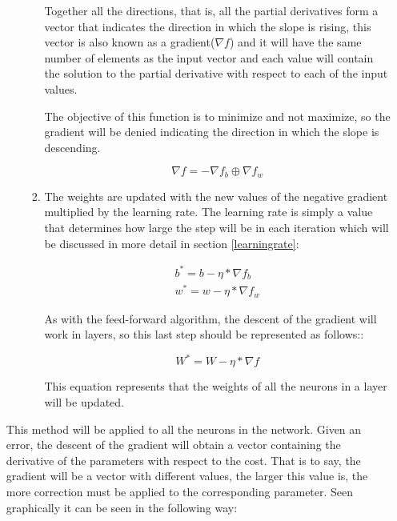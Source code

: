 \begin{itemize}
\begin{enumerate}
\begin{enumerate}
Together all the directions, that is, all the partial derivatives form a vector that indicates the direction in which the slope is rising, this vector is also known as a gradient($\nabla f$) and it will have the same number of elements as the input vector and each value will contain the solution to the partial derivative with respect to each of the input values.
\newline

The objective of this function is to minimize and not maximize, so the gradient will be denied indicating the direction in which the slope is descending.

\begin{equation}
    \nabla f = -\nabla f_b \oplus \nabla f_w
\end{equation}

\item The weights are updated with the new values of the negative gradient multiplied by the learning rate. The learning rate is simply a value that determines how large the step will be in each iteration which will be discussed in more detail in section \ref{learningrate}:

\begin{equation}
    \begin{split}
    b^* = b - \eta * \nabla f_b \\
    w^* = w - \eta * \nabla f_w
    \end{split}
\end{equation}

As with the feed-forward algorithm, the descent of the gradient will work in layers, so this last step should be represented as follows::

\begin{equation}
    W^* = W - \eta * \nabla f
\end{equation}

This equation represents that the weights of all the neurons in a layer will be updated.

\end{enumerate}
\end{enumerate}

This method will be applied to all the neurons in the network. Given an error, the descent of the gradient will obtain a vector containing the derivative of the parameters with respect to the cost. That is to say, the gradient will be a vector with different values, the larger this value is, the more correction must be applied to the corresponding parameter. Seen graphically it can be seen in the following way:


\end{itemize}
